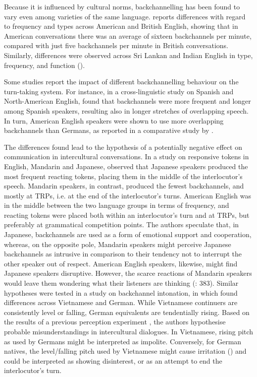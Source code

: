 Because it is influenced by cultural norms, backchannelling has been found to vary even among varieties of the same language. \citet{Tottie1991} reports differences with regard to frequency and types across American and British English, showing that in American conversations there was an average of sixteen backchannels per minute, compared with just five backchannels per minute in British conversations. Similarly, differences were observed across Sri Lankan and Indian English in type, frequency, and function (\citealt{KraazBernaisch2022}).

Some studies report the impact of different backchannelling behaviour on the turn-taking system. For instance, in a cross-linguistic study on Spanish and North-American English, \citet{Berry1994} found that backchannels were more frequent and longer among Spanish speakers, resulting also in longer stretches of overlapping speech. In turn, American English speakers were shown to use more overlapping backchannels than Germans, as reported in a comparative study by \citet{Heinz2003}.

The differences found lead to the hypothesis of a potentially negative effect on communication in intercultural conversations. In a study on responsive tokens in English, Mandarin and Japanese, \citet{ClancyEtAl1996} observed that Japanese speakers produced the most frequent reacting tokens, placing them in the middle of the interlocutor’s speech. Mandarin speakers, in contrast, produced the fewest backchannels, and mostly at TRPs, i.e. at the end of the interlocutor’s turns. American English was in the middle between the two language groups in terms of frequency, and reacting tokens were placed both within an interlocutor’s turn and at TRPs, but preferably at grammatical competition points. The authors speculate that, in Japanese, backchannels are used as a form of emotional support and cooperation, whereas, on the opposite pole, Mandarin speakers might perceive Japanese backchannels as intrusive in comparison to their tendency not to interrupt the other speaker out of respect. American English speakers, likewise, might find Japanese speakers disruptive. However, the scarce reactions of Mandarin speakers would leave them wondering what their listeners are thinking (\citealt{ClancyEtAl1996}: 383). Similar hypotheses were tested in a study on backchannel intonation, in which \citet{HaEtAl2016} found differences across Vietnamese and German. While Vietnamese continuers are consistently level or falling, German equivalents are tendentially rising. Based on the results of a previous perception experiment \citep{Ha2012}, the authors hypothesise probable misunderstandings in intercultural dialogues. In Vietnamese, rising pitch as used by Germans might be interpreted as impolite. Conversely, for German natives, the level/falling pitch used by Vietnamese might cause irritation (\citealt{KoppGibbon2007}) and could be interpreted as showing disinterest, or as an attempt to end the interlocutor’s turn.

